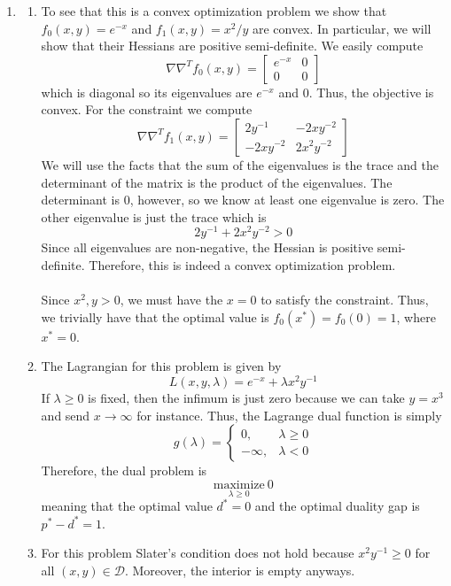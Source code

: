 \documentclass[11pt]{amsart}
\begin{document}
\begin{enumerate}
\item \begin{enumerate}
\item To see that this is a convex optimization problem we show that $f_0(x,y) = e^{-x}$ and $f_1(x,y) = x^2/y$ are convex.  In particular, we will show that their Hessians are positive semi-definite.  We easily compute
\[
\nabla \nabla^T f_0(x,y) = \begin{bmatrix} e^{-x} & 0\\0&0  \end{bmatrix}
\]
which is diagonal so its eigenvalues are $e^{-x}$ and $0$.  Thus, the objective is convex.  For the constraint we compute
\[
\nabla \nabla^T f_1(x,y) = \begin{bmatrix}
2y^{-1} & -2xy^{-2}\\
-2xy^{-2} & 2x^2y^{-2}
\end{bmatrix}
\]
We will use the facts that the sum of the eigenvalues is the trace and the determinant of the matrix is the product of the eigenvalues.  The determinant is 0, however, so we know at least one eigenvalue is zero.  The other eigenvalue is just the trace which is
\[
2y^{-1} + 2x^2y^{-2} > 0
\]
Since all eigenvalues are non-negative, the Hessian is positive semi-definite.  Therefore, this is indeed a convex optimization problem.\\
\\
Since $x^2,y > 0$, we must have the $x = 0$ to satisfy the constraint.  Thus, we trivially have that the optimal value is $f_0(x^*) = f_0(0) = 1$, where $x^* = 0$.





\item The Lagrangian for this problem is given by
\[
L(x,y,\lambda) = e^{-x} + \lambda x^2 y^{-1}
\]
If $\lambda \ge 0$ is fixed, then the infimum is just zero because we can take $y = x^3$ and send $x \to \infty$ for instance.  Thus, the Lagrange dual function is simply
\[
g(\lambda) = \begin{cases}
0, & \lambda \ge 0\\
-\infty, & \lambda < 0
\end{cases}
\]
Therefore, the dual problem is
\[
\underset{\lambda \ge 0}{\mathrm{maximize}}\ 0
\]
meaning that the optimal value $d^* = 0$ and the optimal duality gap is $p^* - d^* = 1$.




\item For this problem Slater's condition does not hold because $x^2 y^{-1} \ge 0$ for all $(x,y) \in \mathcal{D}$.  Moreover, the interior is empty anyways.



\end{enumerate}
\end{enumerate}
\end{document}
